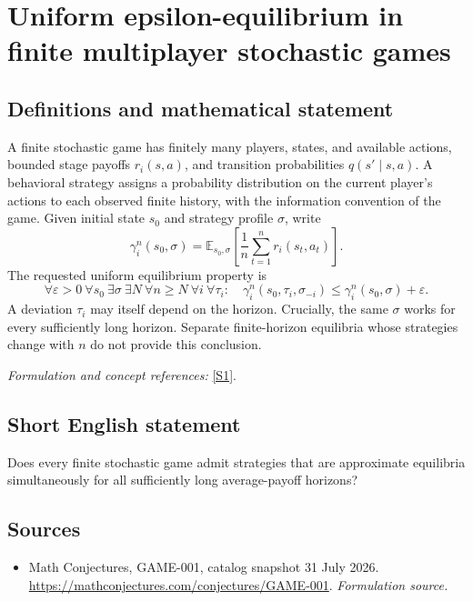 \documentclass[11pt]{article}
\begin{document}
\section*{\texorpdfstring{Uniform epsilon-equilibrium in finite multiplayer stochastic games}{Uniform epsilon-equilibrium in finite multiplayer stochastic games}}\label{30006946}
\subsection{Definitions and mathematical statement}
A finite stochastic game has finitely many players, states, and available actions, bounded stage payoffs $r_i(s,a)$, and transition probabilities $q(s'\mid s,a)$. A behavioral strategy assigns a probability distribution on the current player's actions to each observed finite history, with the information convention of the game. Given initial state $s_0$ and strategy profile $\sigma$, write
\[
 \gamma_i^n(s_0,\sigma)={\mathbb{E}}_{s_0,\sigma}
 \left[\frac1n\sum_{t=1}^n r_i(s_t,a_t)\right].
\]
The requested uniform equilibrium property is
\[
 \forall{\varepsilon}>0\ \forall s_0\ \exists\sigma\ \exists N\
 \forall n\ge N\ \forall i\ \forall\tau_i:\quad
 \gamma_i^n(s_0,\tau_i,\sigma_{-i})
 \le\gamma_i^n(s_0,\sigma)+{\varepsilon}.
\]
A deviation $\tau_i$ may itself depend on the horizon. Crucially, the same $\sigma$ works for every sufficiently long horizon. Separate finite-horizon equilibria whose strategies change with $n$ do not provide this conclusion.
\par\smallskip\textit{Formulation and concept references:} \href{https://mathconjectures.com/conjectures/GAME-001}{[S1]}.

\subsection{Short English statement}
Does every finite stochastic game admit strategies that are approximate equilibria simultaneously for all sufficiently long average-payoff horizons?
\subsection{Sources}
\begin{itemize}
\item[S1]Math Conjectures, GAME-001, catalog snapshot 31 July 2026.
\url{https://mathconjectures.com/conjectures/GAME-001}.
\textit{Formulation source.}
\end{itemize}
\end{document}
